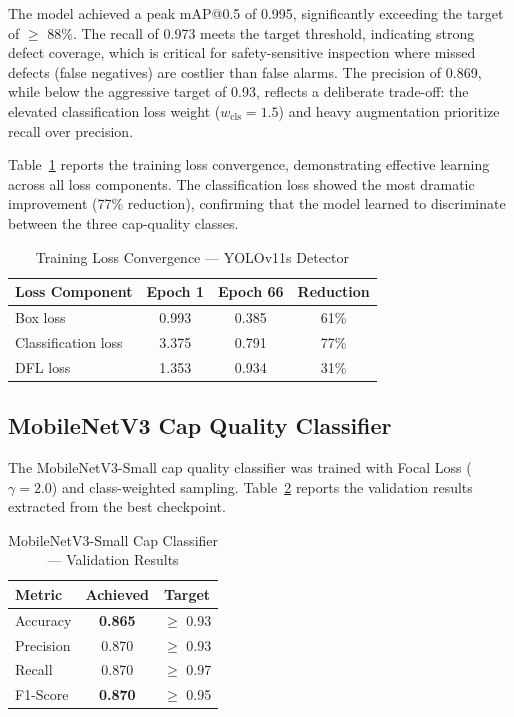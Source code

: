\documentclass{ieeeaccess}
\begin{document}
The model achieved a peak mAP@0.5 of 0.995, significantly exceeding the target of $\geq$ 88\%. The recall of 0.973 meets the target threshold, indicating strong defect coverage, which is critical for safety-sensitive inspection where missed defects (false negatives) are costlier than false alarms. The precision of 0.869, while below the aggressive target of 0.93, reflects a deliberate trade-off: the elevated classification loss weight ($w_{\text{cls}} = 1.5$) and heavy augmentation prioritize recall over precision.

Table~\ref{tab:loss_curves} reports the training loss convergence, demonstrating effective learning across all loss components. The classification loss showed the most dramatic improvement (77\% reduction), confirming that the model learned to discriminate between the three cap-quality classes.

\begin{table}[!t]
\caption{Training Loss Convergence --- YOLOv11s Detector}
\label{tab:loss_curves}
\centering
\small
\begin{tabular}{lccc}
\toprule
\textbf{Loss Component} & \textbf{Epoch 1} & \textbf{Epoch 66} & \textbf{Reduction} \\
\midrule
Box loss & 0.993 & 0.385 & 61\% \\
Classification loss & 3.375 & 0.791 & 77\% \\
DFL loss & 1.353 & 0.934 & 31\% \\
\bottomrule
\end{tabular}
\end{table}


\subsection{MobileNetV3 Cap Quality Classifier}

The MobileNetV3-Small cap quality classifier was trained with Focal Loss ($\gamma = 2.0$) and class-weighted sampling. Table~\ref{tab:cls_results} reports the validation results extracted from the best checkpoint.

\begin{table}[!t]
\caption{MobileNetV3-Small Cap Classifier --- Validation Results}
\label{tab:cls_results}
\centering
\small
\begin{tabular}{lcc}
\toprule
\textbf{Metric} & \textbf{Achieved} & \textbf{Target} \\
\midrule
Accuracy & \textbf{0.865} & $\geq$ 0.93 \\
Precision & 0.870 & $\geq$ 0.93 \\
Recall & 0.870 & $\geq$ 0.97 \\
F1-Score & \textbf{0.870} & $\geq$ 0.95 \\
\bottomrule
\end{tabular}
\end{table}
\end{document}
